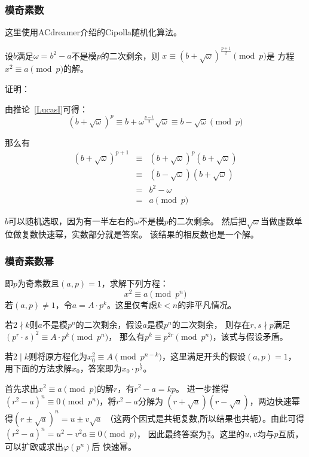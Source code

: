 \subsubsection{模奇素数}
这里使用ACdreamer介绍的Cipolla随机化算法。
\begin{theorem}
    设$b$满足$\omega=b^2-a$不是模$p$的二次剩余，则
    $x\equiv (b+\sqrt{\omega})^\frac{p+1}{2}\pmod{p}$是
    方程$x^2\equiv a\pmod{p}$的解。
\end{theorem}
证明：

由推论~\ref{LucasI}可得：
\begin{displaymath}
    (b+\sqrt{\omega})^p\equiv b+\omega^\frac{p-1}{2}\sqrt{\omega}
    \equiv b-\sqrt{\omega}\pmod{p}
\end{displaymath}

那么有
\begin{eqnarray*}
    (b+\sqrt{\omega})^{p+1}&\equiv&(b+\sqrt{\omega})^p(b+\sqrt{\omega})\\
    &\equiv&(b-\sqrt{\omega})(b+\sqrt{\omega})\\
    &=&b^2-\omega\\
    &=&a \pmod{p}
\end{eqnarray*}

$b$可以随机选取，因为有一半左右的$\omega$不是模$p$的二次剩余。
然后把$\sqrt{\omega}$当做虚数单位做复数快速幂，实数部分就是答案。
该结果的相反数也是一个解。
\subsubsection{模奇素数幂}
即$p$为奇素数且$(a,p)=1$，求解下列方程：
\begin{displaymath}
	x^2\equiv a \pmod{p^n}
\end{displaymath}
若$(a,p)\neq 1$，令$a=A\cdot p^k$。这里仅考虑$k<n$的非平凡情况。

若$2\nmid k$则$a$不是模$p^n$的二次剩余，假设$a$是模$p^n$的二次剩余，
则存在$r,s\nmid p$满足$(p^r\cdot s)^2\equiv A\cdot p^k\pmod{p^n}$，
那么有$p^k\equiv p^{2r}\pmod{p^n}$，该式与假设矛盾。

若$2\mid k$则将原方程化为$x_0^2\equiv A \pmod{p^{n-k}}$，这里满足开头的假设$(a,p)=1$，
用下面的方法求解$x_0$，答案即为$x_0\cdot p^\frac{k}{2}$。

首先求出$x^2\equiv a \pmod{p}$的解$r$，有$r^2-a=kp$。
进一步推得$(r^2-a)^n\equiv 0 \pmod{p^n}$，将$r^2-a$分解为
$(r+\sqrt{a})(r-\sqrt{a})$，两边快速幂得$(r\pm\sqrt{a})^n=u\pm v\sqrt{a}$
（这两个因式是共轭复数,所以结果也共轭）。由此可得$(r^2-a)^n=u^2-v^2a\equiv 0\pmod{p}$，
因此最终答案为$\frac{u}{v}$。这里的$u,v$均与$p$互质，可以扩欧或求出$\varphi(p^n)$后
快速幂。
